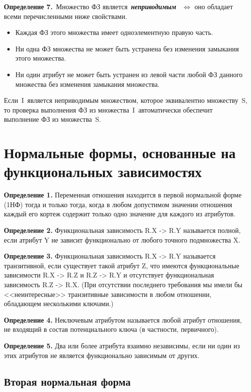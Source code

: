 \textbf{Определение 7.} Множество ФЗ является \textit{\bfseries неприводимым}  $\Leftrightarrow$ оно обладает всеми перечисленными ниже свойствами.

\begin{itemize}[label*=--]
	\item Каждая ФЗ этого множества имеет одноэлементную правую часть.
	\item Ни одна ФЗ множества не может быть устранена без изменения замыкания этого множества.
	\item Ни один атрибут не может быть устранен из левой части любой ФЗ данного множества без изменения замыкания множества.
\end{itemize}

Если I является неприводимым множеством, которое эквивалентно множеству S, то проверка выполнения ФЗ из множества I автоматически обеспечит выполнение ФЗ из множества S.

\section{Нормальные формы, основанные на функциональных зависимостях}

\textbf{Определение 1.} Переменная отношения находится в первой нормальной форме (1НФ) тогда и только тогда, когда в любом допустимом значении отношения каждый его кортеж содержит только одно значение для каждого из атрибутов.

\textbf{Определение 2.} Функциональная зависимость R.X -> R.Y называется полной, если атрибут Y не зависит функционально от любого точного подмножества X.

\textbf{Определение 3.} Функциональная зависимость R.X -> R.Y называется транзитивной, если существует такой атрибут Z, что имеются функциональные зависимости R.X -> R.Z и R.Z -> R.Y и отсутствует функциональная зависимость R.Z -> R.X. 
(При отсутствии последнего требования мы имели бы <<неинтересные>> транзитивные зависимости в любом отношении, обладающем несколькими ключами.)

\textbf{Определение 4.} Неключевым атрибутом называется любой атрибут отношения, не входящий в состав потенциального ключа (в частности, первичного).

\textbf{Определение 5.} Два или более атрибута взаимно независимы, если ни один из этих атрибутов не является функционально зависимым от других.

\subsection*{Вторая нормальная форма}

